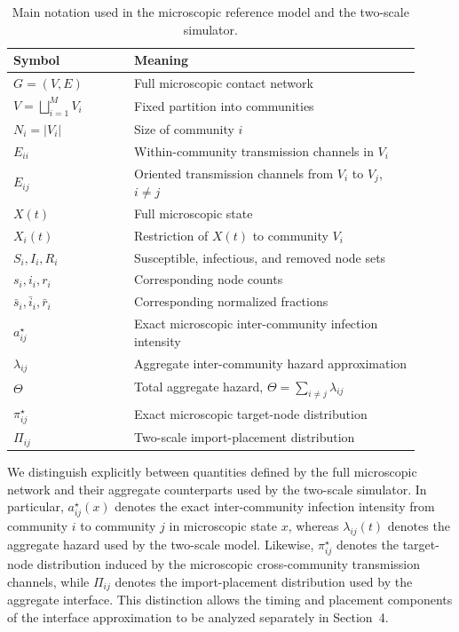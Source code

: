 \documentclass[a4paper,fleqn]{cas-sc}
\begin{document}
\begin{table}[htbp]
\centering
\caption{Main notation used in the microscopic reference model and the two-scale simulator.}
\label{tab:notation}
\begin{tabular}{p{0.27\linewidth} p{0.64\linewidth}}
\hline
\textbf{Symbol} & \textbf{Meaning} \\
\hline
$G=(V,E)$ & Full microscopic contact network \\
$V=\bigsqcup_{i=1}^{M}V_i$ & Fixed partition into communities \\
$N_i=|V_i|$ & Size of community $i$ \\
$E_{ii}$ & Within-community transmission channels in $V_i$ \\
$E_{ij}$ & Oriented transmission channels from $V_i$ to $V_j$, $i\neq j$ \\
$X(t)$ & Full microscopic state \\
$X_i(t)$ & Restriction of $X(t)$ to community $V_i$ \\
$S_i,I_i,R_i$ & Susceptible, infectious, and removed node sets \\
$s_i,i_i,r_i$ & Corresponding node counts \\
$\bar{s}_i,\bar{i}_i,\bar{r}_i$ & Corresponding normalized fractions \\
$a^\star_{ij}$ & Exact microscopic inter-community infection intensity \\
$\lambda_{ij}$ & Aggregate inter-community hazard approximation \\
$\Theta$ & Total aggregate hazard, $\Theta=\sum_{i\neq j}\lambda_{ij}$ \\
$\pi^\star_{ij}$ & Exact microscopic target-node distribution \\
$\Pi_{ij}$ & Two-scale import-placement distribution \\
\hline
\end{tabular}
\end{table}

We distinguish explicitly between quantities defined by the full microscopic network and their aggregate counterparts used by the two-scale simulator. In particular, $a^\star_{ij}(x)$ denotes the exact inter-community infection intensity from community $i$ to community $j$ in microscopic state $x$, whereas $\lambda_{ij}(t)$ denotes the aggregate hazard used by the two-scale model. Likewise, $\pi^\star_{ij}$ denotes the target-node distribution induced by the microscopic cross-community transmission channels, while $\Pi_{ij}$ denotes the import-placement distribution used by the aggregate interface. This distinction allows the timing and placement components of the interface approximation to be analyzed separately in Section~4.
\end{document}
